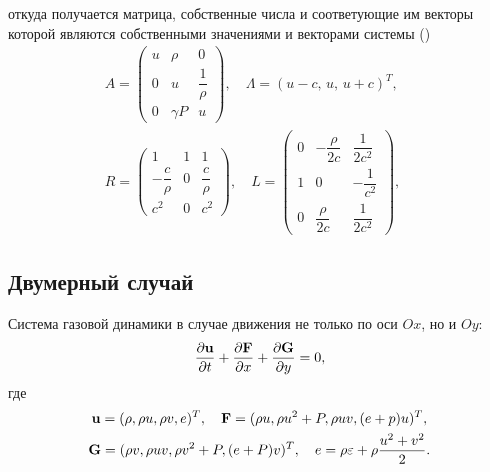 \documentclass[12pt,a4paper]{article}
\newcommand{\dpartial}[2]{\dfrac{ \partial #1 }{ \partial #2 }}
\begin{document}
      \noindent откуда получается матрица, собственные числа и соответующие им векторы которой являются собственными значениями и векторами системы ()
      \begin{equation}
        \label{eigen1d}
        \begin{array}{c}
                A = \begin{pmatrix}
                    u & \rho & 0 \\
                    0 & u & \dfrac{1}{\rho} \\
                    0 & \gamma P & u
                \end{pmatrix}, \quad
                \Lambda = (
                    u - c,\, u,\, u + c
                )^T, \\
                R = \begin{pmatrix}
                    1 & 1 & 1 \\[2mm]
                    -\dfrac{c}{\rho} & 0 & \dfrac{c}{\rho} \\[4mm]
                    c^2 & 0 & c^2
                \end{pmatrix}, \quad 
                L = \begin{pmatrix}
                    0 & -\dfrac{\rho}{2c} & \dfrac{1}{2c^2} \\[3mm]
                    1 & 0 & -\dfrac{1}{c^2} \\[3mm]
                    0 & \dfrac{\rho}{2c} & \dfrac{1}{2 c^2}
                \end{pmatrix}, \quad 
            \end{array}
    \end{equation}

        \subsection{Двумерный случай}

        Система газовой динамики в случае движения не только по оси $Ox$, но и $Oy \colon$
        \begin{equation}
            \label{system:2d}
            \dpartial{\bold u}{t} + \dpartial{\bold F}{x} + \dpartial{\bold G}{y} = 0,
        \end{equation}
        \noindent где 
        \begin{gather*}
            \bold u = (\rho, \rho u, \rho v, e)^T, \quad \bold F = (\rho u, \rho u^2 + P, \rho u v, (e + p) u)^T, \\
            \bold G = (\rho v, \rho u v, \rho v^2 + P, (e + P) v)^T, \quad e = \rho \varepsilon + \rho \dfrac{u^2 + v^2}{2}.
        \end{gather*}
\end{document}
